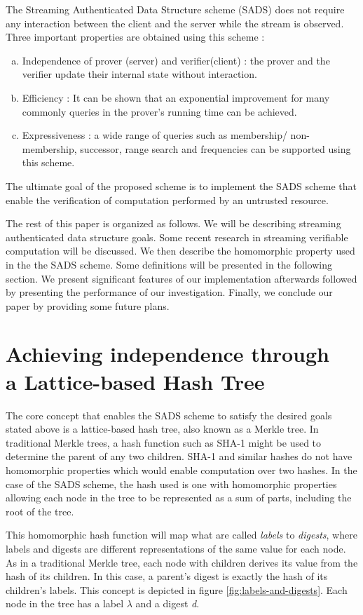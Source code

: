 \documentclass[11pt, letterpaper, oneside]{article}
\begin{document}
	The Streaming Authenticated Data Structure scheme (SADS) does not require any interaction between the client and the server while the stream is observed.
	Three important properties are obtained using this scheme :
	\begin{enumerate}[a.]
		\item Independence of prover (server) and verifier(client) : the prover and the verifier update their internal state without interaction.
		\item Efficiency : It can be shown that an exponential improvement for many commonly queries in the prover's running time can be achieved.
		\item Expressiveness : a wide range of queries such as membership/ non-membership, successor, range search and frequencies can be supported using this scheme.
	\end{enumerate} 
	The ultimate goal of the proposed scheme is to implement the SADS scheme that enable the verification of computation performed by an untrusted resource.
	
	The rest of this paper is organized as follows. We will be describing streaming authenticated data structure goals.
	Some recent research in streaming verifiable computation will be discussed.
	We then describe the homomorphic property used in the the SADS scheme. Some definitions will be presented in the following section.
	We present significant features of our implementation afterwards followed by presenting the performance of our investigation.
	Finally, we conclude our paper by providing some future plans.
	
\section{ Achieving independence through \\ a Lattice-based Hash Tree }

	The core concept that enables the SADS scheme to satisfy the desired goals stated above is a lattice-based hash tree, also known as a Merkle tree.
	In traditional Merkle trees, a hash function such as SHA-1 might be used to determine the parent of any two children.
	SHA-1 and similar hashes do not have homomorphic properties which would enable computation over two hashes.
	In the case of the SADS scheme, the hash used is one with homomorphic properties allowing each node in the tree to be represented as a sum of parts, including the root of the tree.
	
	This homomorphic hash function will map what are called \textit{labels} to \textit{digests}, where labels and digests are different representations of the same value for each node.
	As in a traditional Merkle tree, each node with children derives its value from the hash of its children.
	In this case, a parent's digest is exactly the hash of its children's labels.
	This concept is depicted in figure \ref{fig:labels-and-digests}.	
	Each node in the tree has a label $\lambda$ and a digest \textit{d}.
	
\end{document}
